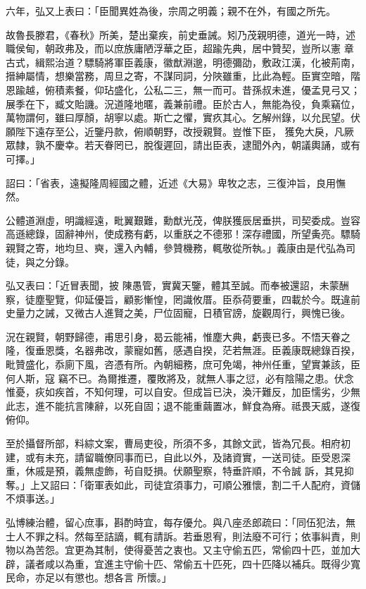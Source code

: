 \begin{pinyinscope}
 六年，弘又上表曰：「臣聞異姓為後，宗周之明義；親不在外，有國之所先。



 故魯長滕君，《春秋》所美，楚出棄疾，前史垂誡。矧乃茂親明德，道光一時，述職侯甸，朝政弗及，而以庶族庸陋浮華之臣，超踰先典，居中贊契，豈所以憲
 章古式，緝熙治道？驃騎將軍臣義康，徽猷淵邈，明德彌劭，敷政江漢，化被荊南，搢紳屬情，想樂當務，周旦之寄，不謀同詞，分陜雖重，比此為輕。臣實空暗，階恩踰越，俯積素餐，仰玷盛化，公私二三，無一而可。昔孫叔未進，優孟見弓又；展季在下，臧文貽譏。況道隆地暱，義兼前禮。臣於古人，無能為役，負乘竊位，萬物謂何，雖曰厚顏，胡寧以處。斯亡之懼，實疚其心。乞解州錄，以允民望。伏願陛下遠存至公，近鑒丹款，俯順朝野，改授親賢。豈惟下臣，
 獲免大戾，凡厥眾隸，孰不慶幸。若天眷罔已，脫復遲回，請出臣表，逮聞外內，朝議輿誦，或有可擇。」



 詔曰：「省表，遠擬隆周經國之體，近述《大易》卑牧之志，三復沖旨，良用憮然。



 公體道淵虛，明識經遠，毗翼艱難，勳猷光茂，俾朕獲辰居垂拱，司契委成。豈容高遜總錄，固辭神州，使成務有虧，以重朕之不德邪！深存禮國，所望夤亮。驃騎親賢之寄，地均旦、奭，還入內輔，參贊機務，輒敬從所執。」義康由是代弘為司徒，與之分錄。



 弘又表曰：「近冒表聞，披
 陳愚管，實冀天鑒，體其至誠。而奉被還詔，未蒙酬察，徒塵聖覽，仰延優旨，顧影慚惶，罔識攸厝。臣忝荷要重，四載於今。既違前史量力之誡，又微古人進賢之美，尸位固寵，日積官謗，旋觀周行，興愧已後。



 況在親賢，朝野歸德，甫思引身，曷云能補，惟塵大典，虧喪已多。不悟天眷之隆，復垂恩獎，名器弗改，蒙寵如舊，感遇自揆，茫若無涯。臣義康既總錄百揆，毗贊盛化，忝廁下風，咨憑有所。內朝細務，庶可免竭，神州任重，望實兼該，臣何人斯，寇
 竊不已。為爾推遷，覆敗將及，就無人事之愆，必有陰陽之患。伏念惟憂，疢如疾首，不知何理，可以自安。但成旨已決，渙汗難反，加臣懦劣，少無此志，進不能抗言陳辭，以死自固；退不能重繭置冰，鮮食為瘠。祗畏天威，遂復俯仰。



 至於攝督所部，料綜文案，曹局吏役，所須不多，其餘文武，皆為冗長。相府初建，或有未充，請留職僚同事而已，自此以外，及諸資實，一送司徒。臣受恩深重，休戚是預，義無虛飾，茍自貶損。伏願聖察，特垂許順，不令誠
 訴，其見抑奪。」上又詔曰：「衛軍表如此，司徒宜須事力，可順公雅懷，割二千人配府，資儲不煩事送。」



 弘博練治體，留心庶事，斟酌時宜，每存優允。與八座丞郎疏曰：「同伍犯法，無士人不罪之科。然每至詰謫，輒有請訴。若垂恩宥，則法廢不可行；依事糾責，則物以為苦怨。宜更為其制，使得憂苦之衷也。又主守偷五匹，常偷四十匹，並加大辟，議者咸以為重，宜進主守偷十匹、常偷五十匹死，四十匹降以補兵。既得少寬民命，亦足以有懲也。想各言
 所懷。」




\end{pinyinscope}

